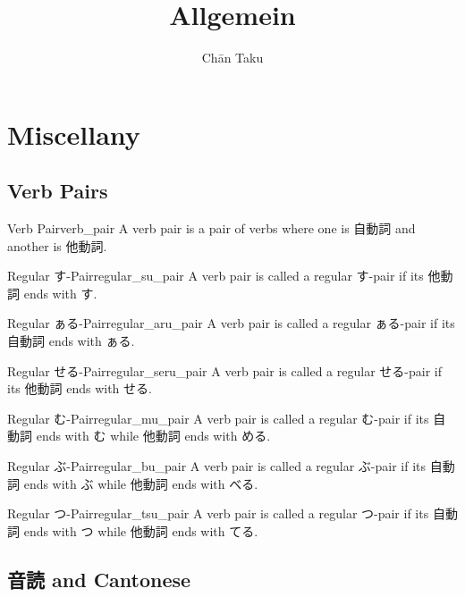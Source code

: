 \documentclass{article}
\title{Allgemein}
\author{Ch\=an Taku}
\begin{document}
\maketitle

\section{Miscellany}

\subsection{Verb Pairs}

\begin{definition}{Verb Pair}{verb_pair}
    A verb pair is a pair of verbs where one is 自動詞 and another is 他動詞.
\end{definition}

\begin{definition}{Regular す-Pair}{regular_su_pair}
    A verb pair is called a regular す-pair if its 他動詞 ends with す.
\end{definition}

\begin{definition}{Regular ぁる-Pair}{regular_aru_pair}
    A verb pair is called a regular ぁる-pair if its 自動詞 ends with ぁる.
\end{definition}

\begin{definition}{Regular せる-Pair}{regular_seru_pair}
    A verb pair is called a regular せる-pair if its 他動詞 ends with せる.
\end{definition}

\begin{definition}{Regular む-Pair}{regular_mu_pair}
    A verb pair is called a regular む-pair if its 自動詞 ends with む while 他動詞 ends with める.
\end{definition}

\begin{definition}{Regular ぶ-Pair}{regular_bu_pair}
    A verb pair is called a regular ぶ-pair if its 自動詞 ends with ぶ while 他動詞 ends with べる.
\end{definition}

\begin{definition}{Regular つ-Pair}{regular_tsu_pair}
    A verb pair is called a regular つ-pair if its 自動詞 ends with つ while 他動詞 ends with てる.
\end{definition}

\subsection{音読 and Cantonese}
\end{document}
